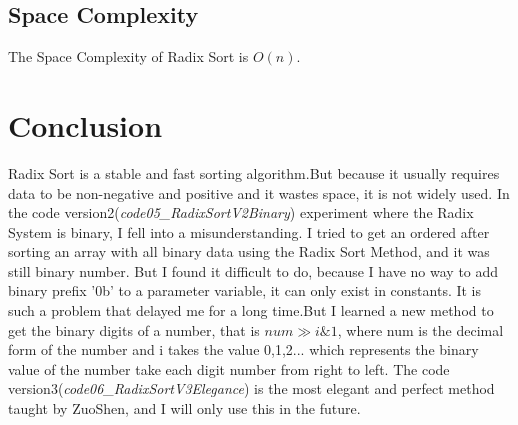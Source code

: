 \documentclass[11pt]{article}
\begin{document}
    \subsection{Space Complexity}
    The Space Complexity of Radix Sort is $O(n)$.

    \section{Conclusion}
    Radix Sort is a stable and fast sorting algorithm.But because it usually requires data to be non-negative and positive and it wastes
    space, it is not widely used.
    In the code version2(\emph{code05\_RadixSortV2Binary}) experiment where the Radix System is binary, I fell into a misunderstanding.
    I tried to get an ordered after sorting an array with all binary data using the Radix Sort Method, and it was still binary number.
    But I found it difficult to do, because I have no way to add binary prefix '0b' to a parameter variable, it can only exist in constants.
    It is such a problem that delayed me for a long time.But I learned a new method to get the binary digits of a number, that is $num \gg i \& 1$,
    where num is the decimal form of the number and i takes the value 0,1,2... which represents the binary value of the number take each digit number
    from right to left.
    The code version3(\emph{code06\_RadixSortV3Elegance}) is the most elegant and perfect method taught by ZuoShen, and I will only use this in the future.
\end{document}
